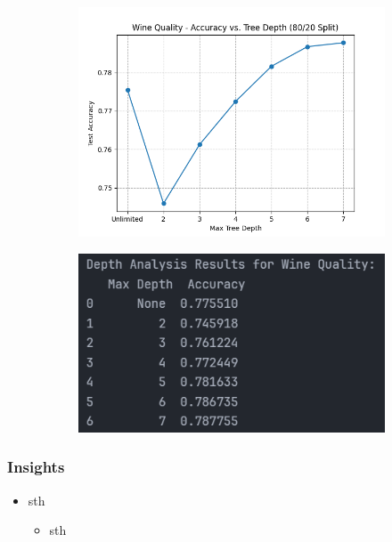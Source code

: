 \begin{figure}[H]
	\centering
	\begin{subfigure}{0.45\textwidth}
		\centering
		\includegraphics[width=\textwidth]{imgs/accuracy_vs_depth_wine_quality.png}
	\end{subfigure}
	\hfill
	\begin{subfigure}{0.45\textwidth}
		\centering
		\includegraphics[width=\textwidth]{imgs/accuracy_vs_depth_wine_quality__analysis.png}
	\end{subfigure}
\end{figure}

\clearpage
\subsubsection*{Insights}
\begin{itemize}
	\item sth
	      \begin{itemize}
		      \item sth
	      \end{itemize}
\end{itemize}

